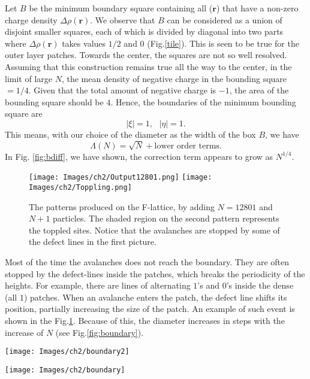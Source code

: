 \documentclass[11pt,a4paper]{book}
\begin{document}
Let $B$ be the minimum boundary square containing all
($\mathbf{r}$)
that have a non-zero charge density $\Delta\rho(\mathbf{r})$. We
observe that $B$ can be considered as a union of
disjoint smaller squares, each of which is divided by diagonal into two 
parts where $\Delta \rho(\mathbf{r})$ takes values $1/2$ and $0$
(Fig.\ref{tile}). This is seen to be true for the
outer layer patches. Towards the center, the squares are not so well
resolved. Assuming that this construction remains true all the way to the
center, in the limit of large $N$, the mean density of negative 
charge in the bounding square $=1/4$. Given that the total amount of 
negative charge is $-1$, the area of the bounding square should be $4$. 
Hence, the boundaries of the minimum bounding square are
\begin{equation}
|\xi|=1, \textrm{          } |\eta|=1.
\end{equation}
This means, with our choice of the diameter as the width of the box
$B$, we have
\begin{equation}
\Lambda\left( N \right)=\sqrt{N}+\textrm{lower order terms}.
\label{eq:boundary}
\end{equation}
In Fig. \ref{fig:bdiff}, we have shown, the correction term appears to
grow as $N^{1/4}$.
\begin{figure}
\begin{center}
\texttt{[image: Images/ch2/Output12801.png]}
\texttt{[image: Images/ch2/Toppling.png]}
\caption{The patterns produced on the F-lattice, by adding $N=12801$ and
$N+1$ particles. The shaded region on the second pattern represents the
toppled sites. Notice that the avalanches are stopped by some of the defect
lines in the first picture.}
\label{succ}
\end{center}
\end{figure}

Most of the time the avalanches does not
reach the boundary. They are often stopped by the defect-lines inside the patches,
which breaks the periodicity of the heights. For example, there are
lines of alternating $1$'s and $0$'s inside the dense (all $1$)
patches. When an avalanche enters the patch, the defect line shifts
its position, partially increasing the size of the patch. An example
of such event is shown in the Fig.\ref{succ}. Because of this, the diameter
increases in steps with the increase of $N$ (see
Fig.\ref{fig:boundary}).
\begin{SCfigure}
\texttt{[image: Images/ch2/boundary2]}
\caption{Difference of the diameter to $\sqrt{N}$ is less than
$3$ for $N$, at least, up to $10^{5}$.}
\label{fig:bdiff}
\end{SCfigure}
\begin{SCfigure}
\texttt{[image: Images/ch2/boundary]}
\caption{$\Lambda$ for the F-lattice pattern (Fig. \ref{flattice}) as
a function of $N$, in the range $5000\le N \le 10000$.}
\label{fig:boundary}
\end{SCfigure}
\end{document}
